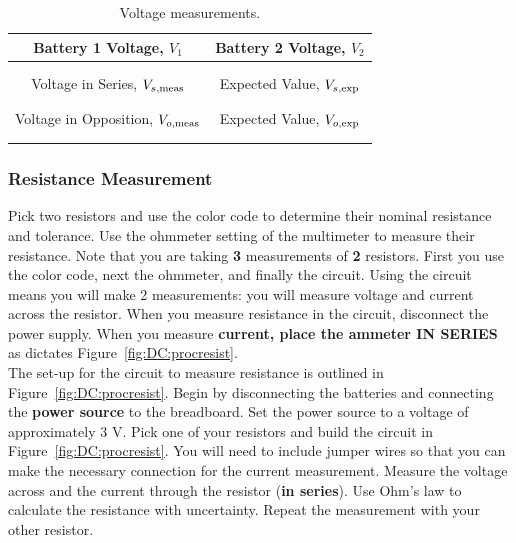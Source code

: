 \begin{table}[!htb]
\begin{center}
\begin{tabular}{|c|c|}
\hline
Battery 1 Voltage, $V_1$ & Battery 2 Voltage, $V_2$  \\ 
\hline
\hspace*{5cm} & \hspace*{5cm}\\
& \\
\hline
\hline
Voltage in Series, $V_{s,\rm meas}$ & Expected Value, $V_{s,\rm exp}$\\
\hline
& \\
& \\
\hline
Voltage in Opposition, $V_{o,\rm meas}$ & Expected Value, $V_{o,\rm exp}$\\
\hline
& \\
& \\
\hline
\end{tabular}
\end{center}
\caption{Voltage measurements.}
\label{tab:DC:battseries}
\end{table}

\subsubsection{Resistance Measurement}
\label{sec:DC:resist}

Pick two resistors and use the color code to determine their nominal resistance
and tolerance. Use the ohmmeter setting of the multimeter to measure their
resistance.
Note that you are taking {\bf 3} measurements of
{\bf 2} resistors.  First you use the color code, next the ohmmeter, and 
finally the circuit.  Using the circuit means you will make 2 measurements:
you will measure voltage and current across the resistor.  When you measure
resistance in the circuit, disconnect the power supply.  When you measure
{\bf current, place the ammeter IN SERIES} as dictates 
Figure~\ref{fig:DC:procresist}. \\   

\noindent The set-up for the circuit to measure resistance is outlined 
in Figure~\ref{fig:DC:procresist}.  
Begin by disconnecting the batteries and connecting the {\bf power source}
to the breadboard. Set the power source 
to a voltage of approximately 3 V. Pick one of your resistors and build the 
circuit in Figure~\ref{fig:DC:procresist}. You will need to include jumper 
wires so that you can make the necessary connection for the current 
measurement.  Measure the voltage across and the current through the resistor
({\bf in series}).
Use Ohm's law to calculate the resistance with uncertainty.  Repeat the
measurement with your other resistor.   \\

